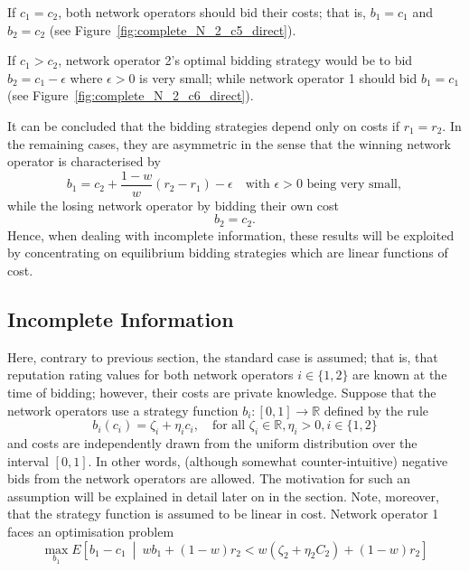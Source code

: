 If $c_1 = c_2$, both network operators should bid their costs; that is, $b_1 = c_1$ and $b_2 = c_2$ (see Figure~\ref{fig:complete_N_2_c5_direct}).

If $c_1 > c_2$, network operator 2's optimal bidding strategy would be to bid $b_2 = c_1 - \epsilon$ where $\epsilon>0$ is very small; while network operator 1 should bid $b_1 = c_1$ (see Figure~\ref{fig:complete_N_2_c6_direct}).

It can be concluded that the bidding strategies depend only on costs if $r_1 = r_2$. In the remaining cases, they are asymmetric in the sense that the winning network operator is characterised by
\begin{equation}
	b_1 = c_2 + \frac{1-w}{w}(r_2 - r_1) - \epsilon \quad\text{with }\epsilon>0\text{ being very small},
\end{equation}
while the losing network operator by bidding their own cost
\begin{equation}
	b_2 = c_2.
\end{equation}
Hence, when dealing with incomplete information, these results will be exploited by concentrating on equilibrium bidding strategies which are linear functions of cost.

\subsection{Incomplete Information} %
\label{sub:incomplete_information_n_2_direct}
Here, contrary to previous section, the standard case is assumed; that is, that reputation rating values for both network operators $i\in\{1,2\}$ are known at the time of bidding; however, their costs are private knowledge. Suppose that the network operators use a strategy function $b_i: [0,1]\to\mathbb{R}$ defined by the rule
\begin{equation}
	\label{eq:pcomp_bidding_str_direct}
	b_i(c_i) = \zeta_i + \eta_i c_i,\quad\text{for all } \zeta_i\in\mathbb{R},\eta_i>0,i\in\{ 1,2 \}
\end{equation}
and costs are independently drawn from the uniform distribution over the interval $[0,1]$. In other words, (although somewhat counter-intuitive) negative bids from the network operators are allowed. The motivation for such an assumption will be explained in detail later on in the section. Note, moreover, that the strategy function is assumed to be linear in cost. Network operator 1 faces an optimisation problem
\begin{equation}
	\label{eq:pcomp_exp_utility_uc_direct}
	\max_{b_1}E \left[ b_1-c_1 \:\middle\vert\: wb_1 + (1-w)r_2 < w(\zeta_2 + \eta_2 C_2) + (1-w)r_2\right]
\end{equation}

